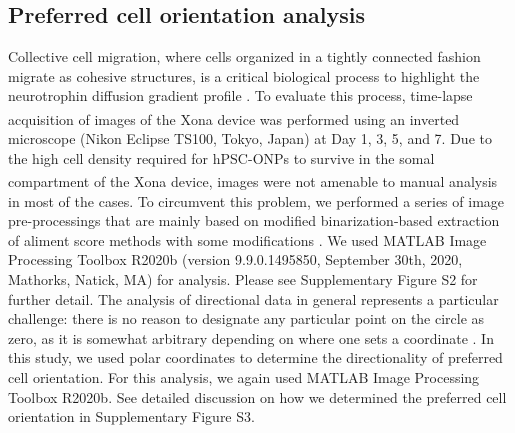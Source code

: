 \documentclass[review]{elsarticle}
\begin{document}
\subsection {Preferred cell orientation analysis}
Collective cell migration, where cells organized in a tightly connected fashion migrate as cohesive structures, is a critical biological process to highlight the neurotrophin diffusion gradient profile \cite{Mazalan2020}. To evaluate this process, time-lapse acquisition of images of the Xona\textsuperscript{\texttrademark} device was performed using an inverted microscope (Nikon Eclipse TS100, Tokyo, Japan) at Day 1, 3, 5, and 7. Due to the high cell density required for hPSC-ONPs to survive in the somal compartment of the Xona\textsuperscript{\texttrademark} device, images were not amenable to manual analysis in most of the cases. To circumvent this problem, we performed a series of image pre-processings that are mainly based on modified binarization-based extraction of aliment score methods with some modifications \cite{Xu2011}. We used MATLAB Image Processing Toolbox R2020b (version 9.9.0.1495850, September 30th, 2020, Mathorks, Natick, MA) for analysis. Please see Supplementary Figure S2 for further detail. The analysis of directional data in general represents a particular challenge: there is no reason to designate any particular point on the circle as zero, as it is somewhat arbitrary depending on where one sets a coordinate \cite{Batschelet1981,Berens2009}. In this study, we used polar coordinates to determine the directionality of preferred cell orientation.  For this analysis, we again used MATLAB Image Processing Toolbox R2020b. See detailed discussion on how we determined the preferred cell orientation in Supplementary Figure S3.
\end{document}
